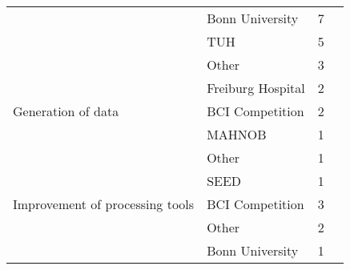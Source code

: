 \begin{tabular}{llrl}
      & Bonn University &            7 &                                                                 \cite{Hussein2018, Ullah2018, Ahmedt-Aristizabal2018, Talathi2017, Acharya2017, Omerhodzic2013, Naderi2010} \\
      & TUH &            5 &                                                                                          \cite{Golmohammadi2017b, Shah2017, Golmohammadi2017a, Golmohammadi2017, Yang2016b} \\
      & Other &            3 &                                                                                                                              \cite{Truong2018, Golmohammadi2017a, Taqi2017} \\
      & Freiburg Hospital &            2 &                                                                                                                                              \cite{Truong2018, Truong2018a} \\
Generation of data & BCI Competition &            2 &                                                                                                                                               \cite{Corley2018, Zhang2018b} \\
      & MAHNOB &            1 &                                                                                                                                                             \cite{Wang2018} \\
      & Other &            1 &                                                                                                                                                       \cite{Schwabedal2018} \\
      & SEED &            1 &                                                                                                                                                             \cite{Wang2018} \\
Improvement of processing tools & BCI Competition &            3 &                                                                                                                                       \cite{Yang2018, Sturm2016, Yang2016a} \\
      & Other &            2 &                                                                                                                                                \cite{Yepes2017, Stober2015} \\
      & Bonn University &            1 &                                                                                                                                                              \cite{Wen2018} \\

\end{tabular}
